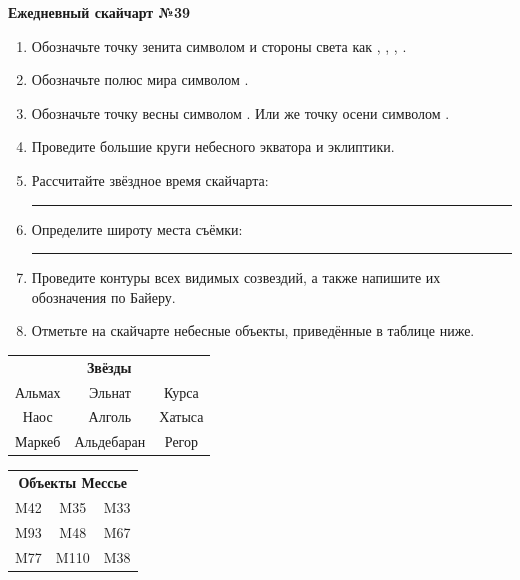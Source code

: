 \documentclass{./SAS-class-skygen}
\begin{document}
    
    
    
	\begin{center}
		\large\textbf{Ежедневный скайчарт №39}
	\end{center}

	\begin{enumerate}
		\item Обозначьте точку зенита символом  и стороны света как , , , .
		\item Обозначьте полюс мира символом .
		\item Обозначьте точку весны символом \Aries. Или же точку осени символом \Libra.
		\item Проведите большие круги небесного экватора и эклиптики.
		\item Рассчитайте звёздное время скайчарта: \rule{2cm}{0.4pt}
		\item Определите широту места съёмки: \rule{2cm}{0.4pt}
		\item Проведите контуры всех видимых созвездий, а также напишите их обозначения по Байеру.
		\item Отметьте на скайчарте небесные объекты, приведённые в таблице ниже.
	\end{enumerate}
	
    \vspace{0.5cm}

    \begin{table}[h!]
    \centering
    \begin{tabular}{ccc}
    \multicolumn{3}{c}{\textbf{Звёзды}} \\ Альмах & Эльнат & Курса \\
Наос & Алголь & Хатыса \\
Маркеб & Альдебаран & Регор \\

\end{tabular}
    \hfill
    \begin{tabular}{ccc}
    \multicolumn{3}{c}{\textbf{Объекты Мессье}} \\ M42 & M35 & M33 \\
M93 & M48 & M67 \\
M77 & M110 & M38 \\

\end{tabular}
    \end{table}
	
\end{document}
